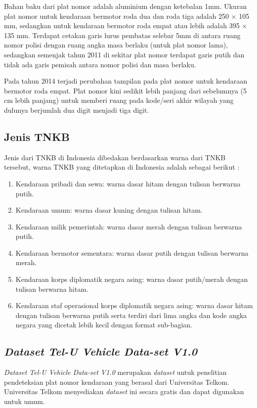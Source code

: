 \noindent Bahan baku dari plat nomor adalah aluminium dengan ketebalan 1mm. Ukuran plat nomor untuk kendaraan bermotor roda dua dan roda tiga adalah 250 $\times$ 105 mm, sedangkan untuk kendaraan bermotor roda empat atau lebih adalah 395 $\times$ 135 mm. Terdapat cetakan garis lurus pembatas selebar 5mm di antara ruang nomor polisi dengan ruang angka masa berlaku (untuk plat nomor lama), sedangkan semenjak tahun 2011 di sekitar plat nomor terdapat garis putih dan tidak ada garis pemisah antara nomor polisi dan masa berlaku.

\noindent Pada tahun 2014 terjadi perubahan tampilan pada plat nomor untuk kendaraan bermotor roda empat. Plat nomor kini sedikit lebih panjang dari sebelumnya (5 cm lebih panjang) untuk memberi ruang pada kode/seri akhir wilayah yang dulunya berjumlah dua digit menjadi tiga digit.\\

\subsection{Jenis TNKB}
\noindent Jenis dari TNKB di Indonesia dibedakan berdasarkan warna dari TNKB tersebut, warna TNKB yang ditetapkan di Indonesia adalah sebagai berikut \cite{polri}:
\begin{enumerate}
\item Kendaraan pribadi dan sewa: warna dasar hitam dengan tulisan berwarna putih.
\item Kendaraan umum: warna dasar kuning dengan tulisan hitam.
\item Kendaraan milik pemerintah: warna dasar merah dengan tulisan berwarna putih.
\item Kendaraan bermotor sementara: warna dasar putih dengan tulisan berwarna merah.
\item Kendaraan korps diplomatik negara asing: warna dasar putih/merah dengan tulisan berwarna hitam.
\item Kendaraan staf operasional korps diplomatik negara asing: warna dasar hitam dengan tulisan berwarna putih serta terdiri dari lima angka dan kode angka negara yang dicetak lebih kecil dengan format sub-bagian.\\
\end{enumerate}

\subsection{\textit{Dataset Tel-U Vehicle Data-set V1.0}}
\noindent \textit{Dataset Tel-U Vehicle Data-set V1.0} merupakan \textit{dataset} untuk penelitian pendeteksian plat nomor kendaraan yang berasal dari Universitas Telkom. Universitas Telkom menyediakan \textit{dataset} ini secara gratis dan dapat digunakan untuk umum.

